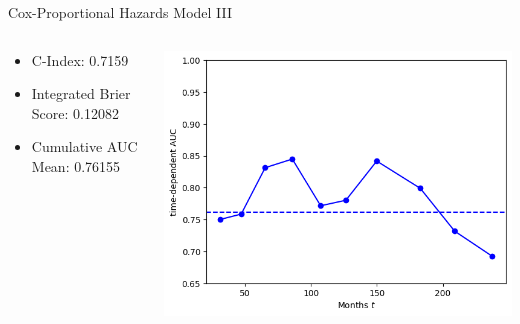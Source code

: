\documentclass{beamer}
\begin{document}
\begin{frame}{Cox-Proportional Hazards Model III}
    \begin{columns}
        \begin{column}{0.49 \textwidth}
            \begin{itemize}
                \item C-Index: 0.7159
                \item Integrated Brier Score: 0.12082
                \item Cumulative AUC Mean: 0.76155
            \end{itemize}
        \end{column}
        \begin{column}{0.49 \textwidth}
            \centering
            \includegraphics[width = \textwidth]{images/cox_auc.png}
        \end{column}
    \end{columns}
\end{frame}
\end{document}
